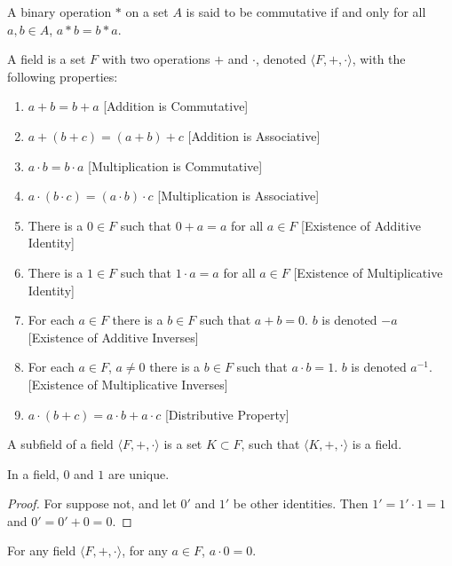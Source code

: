        \begin{definition}
        A binary operation $*$ on a set $A$ is said to be commutative if and only for all $a,b\in A$, $a*b = b*a$.
        \end{definition}
        \begin{definition}
        A field is a set $F$ with two operations $+$ and $\cdot$, denoted $\langle F, +,\cdot \rangle$, with the following properties:
        \begin{enumerate}
        \item $a+b=b+a$ \hfill [Addition is Commutative]
        \item $a+(b+c)=(a+b)+c$ \hfill [Addition is Associative]
        \item $a\cdot b = b\cdot a$ \hfill [Multiplication is Commutative]
        \item $a\cdot (b\cdot c) = (a\cdot b)\cdot c$ \hfill [Multiplication is Associative]
        \item There is a $0\in F$ such that $0+a=a$ for all $a\in F$ \hfill [Existence of Additive Identity]
        \item There is a $1\in F$ such that $1\cdot a = a$ for all $a\in F$ \hfill [Existence of Multiplicative Identity]
        \item For each $a\in F$ there is a $b\in F$ such that $a+b = 0$. $b$ is denoted $-a$ \hfill [Existence of Additive Inverses]
        \item For each $a\in F$, $a\ne 0$ there is a $b\in F$ such that $a\cdot b = 1$. $b$ is denoted $a^{-1}$. \hfill [Existence of Multiplicative Inverses]
        \item $a\cdot(b+c) = a\cdot b + a\cdot c$ \hfill [Distributive Property]
        \end{enumerate}
        \end{definition}
        \begin{definition}
        A subfield of a field $\langle F,+,\cdot \rangle$ is a set $K\subset F$, such that $\langle K, +,\cdot \rangle$ is a field.
        \end{definition}
        \begin{theorem}
        In a field, $0$ and $1$ are unique.
        \end{theorem}
        \begin{proof}
        For suppose not, and let $0'$ and $1'$ be other identities. Then $1'=1'\cdot 1 = 1$ and $0'=0'+0=0$.
        \end{proof}
        \begin{theorem}
        For any field $\langle F,+,\cdot \rangle$, for any $a\in F$, $a\cdot 0 = 0$.
        \end{theorem}
